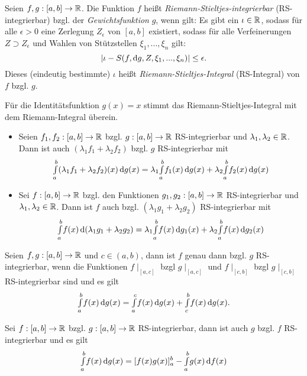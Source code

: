 \documentclass{cheat-sheet}
\begin{document}
\begin{defn}
  Seien $f, g : \left[ a, b \right] \to \mathbb{R}$. Die Funktion $f$ heißt \emph{Riemann-Stieltjes-integrierbar} (RS-integrierbar) bzgl. der \emph{Gewichtsfunktion} $g$, wenn gilt: Es gibt ein $\iota \in \mathbb{R}$, sodass für alle $\epsilon > 0$ eine Zerlegung $Z_{\epsilon}$ von $\left[ a, b \right]$ existiert, sodass für alle Verfeinerungen $Z \supset Z_{\epsilon}$ und Wahlen von Stützstellen $\xi_1, ..., \xi_n$ gilt:
  \[ \lvert\iota - S(f, \mathrm{d} g, Z, \xi_1, ..., \xi_n)\rvert \le \epsilon. \]
  Dieses (eindeutig bestimmte) $\iota$ heißt \emph{Riemann-Stieltjes-Integral} (RS-Integral) von $f$ bzgl. $g$.
\end{defn}

\begin{bem}
Für die Identitätsfunktion $g(x) = x$ stimmt das Riemann-Stieltjes-Integral mit dem Riemann-Integral überein.
\end{bem}


\begin{satz}
\begin{itemize}
  \item Seien $f_1, f_2 : [a, b] \to \mathbb{R}$ bzgl. $g : [a, b] \to \mathbb{R}$ RS-integrierbar und $\lambda_1, \lambda_2 \in \mathbb{R}$. Dann ist auch $(\lambda_1 f_1 + \lambda_2 f_2)$ bzgl. $g$ RS-integrierbar mit
  \[ {\textstyle \int\limits_{a}^{b}} (\lambda_1 f_1 + \lambda_2 f_2)(x) \,\mathrm{d} g(x) = \lambda_1 {\textstyle \int\limits_{a}^{b}} f_1(x) \,\mathrm{d} g(x) + \lambda_2 {\textstyle \int\limits_{a}^{b}} f_2(x) \,\mathrm{d} g(x) \]
  \item Sei $f : [a, b] \to \mathbb{R}$ bzgl. den Funktionen $g_1, g_2 : [a, b] \to \mathbb{R}$ RS-integrierbar und $\lambda_1, \lambda_2 \in \mathbb{R}$. Dann ist $f$ auch bzgl. $(\lambda_1 g_1 + \lambda_2 g_2)$ RS-integrierbar mit
  \[ {\textstyle \int\limits_{a}^{b}} f(x) \,\mathrm{d} (\lambda_1 g_1 + \lambda_2 g_2) = \lambda_1 {\textstyle \int\limits_{a}^{b}} f(x) \,\mathrm{d} g_1(x) + \lambda_2 {\textstyle \int\limits_{a}^{b}} f(x) \,\mathrm{d} g_2(x) \]
\end{itemize}
\end{satz}

\begin{satz}
Seien $f, g : [a, b] \to \mathbb{R}$ und $c \in (a, b)$, dann ist $f$ genau dann bzgl. $g$ RS-integrierbar, wenn die Funktionen $f\mid_{[a, c]}$ bzgl $g\mid_{[a, c]}$ und $f\mid_{[c, b]}$ bzgl $g\mid_{[c, b]}$ RS-integrierbar sind und es gilt
\[ {\textstyle \int\limits_{a}^{b}} f(x) \,\mathrm{d} g(x) = {\textstyle \int\limits_{a}^{c}} f(x) \,\mathrm{d} g(x) + {\textstyle \int\limits_{c}^{b}} f(x) \,\mathrm{d} g(x). \]
\end{satz}

\begin{satz}
Sei $f : [a, b] \to \mathbb{R}$ bzgl. $g : [a, b] \to \mathbb{R}$ RS-integrierbar, dann ist auch $g$ bzgl. $f$ RS-integrierbar und es gilt
\[ {\textstyle \int\limits_{a}^{b}} f(x) \,\mathrm{d} g(x) = [f(x)g(x)]_a^b - {\textstyle \int\limits_{a}^{b}} g(x) \,\mathrm{d} f(x) \]
\end{satz}
\end{document}
